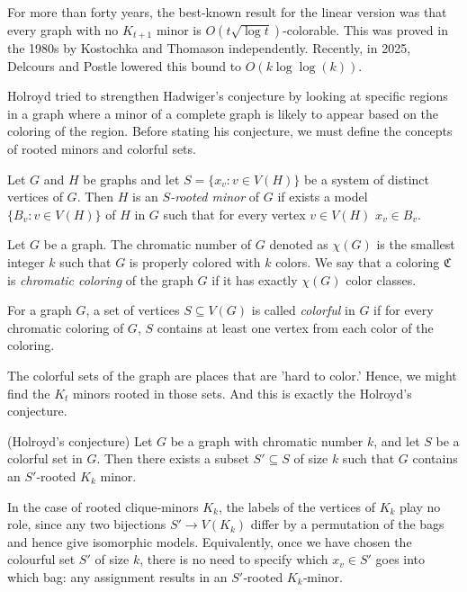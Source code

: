 For more than forty years, the best-known result for the linear version was that every graph with no $K_{t+1}$ minor is $O(t \sqrt{\log t})$-colorable.
This was proved in the 1980s by Kostochka \cite{Kostochka1984} and Thomason \cite{Thomason_1984} independently.
Recently, in 2025, Delcours and Postle \cite{JAMS2025} lowered this bound to $O(k \log \log(k))$.

Holroyd\cite{Holroyd1997} tried to strengthen Hadwiger's conjecture by looking at specific regions in a graph where a minor of a complete graph is likely to appear based on the coloring of the region.
Before stating his conjecture, we must define the concepts of rooted minors and colorful sets.

\begin{defn}
 Let $G$ and $H$ be graphs and let $S = \{x_v: v \in V(H)\}$ be a system of distinct vertices of $G$. Then $H$
 is an \emph{$S$-rooted minor} of $G$ if exists a model $\{B_v : v \in V(H)\}$ of $H$ in $G$ such that for every
 vertex $v \in V(H)$ $x_v \in B_v$.
\end{defn}

\begin{defn}
 Let $G$ be a graph. The chromatic number of $G$ denoted as $\chi(G)$ is the smallest integer $k$ such that $G$ is 
 properly colored with $k$ colors. We say that a coloring $\mathfrak{C}$ is \emph{chromatic coloring} of the graph $G$ if 
 it has exactly $\chi(G)$ color classes.
\end{defn}

\begin{defn}
 For a graph $G$, a set of vertices $S \subseteq V(G)$ is called \emph{colorful} in $G$ if for every chromatic coloring of $G$, $S$ contains at least one 
 vertex from each color of the coloring.
\end{defn}

The colorful sets of the graph are places that are 'hard to color.' Hence, we might find the $K_{t}$ minors rooted in those sets. And this is 
exactly the Holroyd's conjecture.

\begin{conj} (Holroyd's conjecture)
 Let $G$ be a graph with chromatic number $k$, and let $S$ be a colorful set in $G$. Then there exists
 a subset $ S' \subseteq S$ of size $k$ such that $G$ contains an $S'$-rooted $K_k$ minor. 
\end{conj}


\begin{rem}
   In the case of rooted clique‐minors $K_k$, the labels of the vertices of $K_k$ play no role,
   since any two bijections $S'\to V(K_k)$ differ by a permutation of the bags and hence give isomorphic models.
   Equivalently, once we have chosen the colourful set $S'$ of size $k$,
   there is no need to specify which $x_v\in S'$ goes into which bag: 
   any assignment results in an $S'$‐rooted $K_k$‐minor.
 \end{rem}


